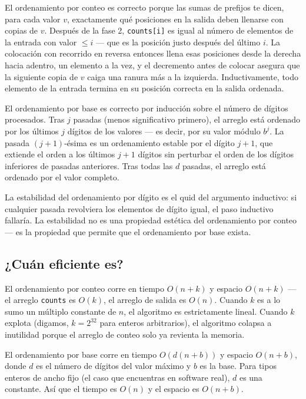 \documentclass[11pt,a4paper]{article}
\begin{document}
El ordenamiento por conteo es correcto porque las sumas de prefijos te dicen, para cada valor $v$, exactamente qué posiciones en la salida deben llenarse con copias de $v$. Después de la fase 2, \texttt{counts[i]} es igual al número de elementos de la entrada con valor $\le i$ --- que es la posición justo después del último $i$. La colocación con recorrido en reversa entonces llena esas posiciones desde la derecha hacia adentro, un elemento a la vez, y el decremento antes de colocar asegura que la siguiente copia de $v$ caiga una ranura más a la izquierda. Inductivamente, todo elemento de la entrada termina en su posición correcta en la salida ordenada.

El ordenamiento por base es correcto por inducción sobre el número de dígitos procesados. Tras $j$ pasadas (menos significativo primero), el arreglo está ordenado por los últimos $j$ dígitos de los valores --- es decir, por su valor módulo $b^j$. La pasada $(j+1)$-ésima es un ordenamiento estable por el dígito $j+1$, que extiende el orden a los últimos $j+1$ dígitos sin perturbar el orden de los dígitos inferiores de pasadas anteriores. Tras todas las $d$ pasadas, el arreglo está ordenado por el valor completo.

La estabilidad del ordenamiento por dígito es el quid del argumento inductivo: si cualquier pasada revolviera los elementos de dígito igual, el paso inductivo fallaría. La estabilidad no es una propiedad estética del ordenamiento por conteo --- es la propiedad que permite que el ordenamiento por base exista.

\subsection*{¿Cuán eficiente es?}

El ordenamiento por conteo corre en tiempo $O(n + k)$ y espacio $O(n + k)$ --- el arreglo \texttt{counts} es $O(k)$, el arreglo de salida es $O(n)$. Cuando $k$ es a lo sumo un múltiplo constante de $n$, el algoritmo es estrictamente lineal. Cuando $k$ explota (digamos, $k = 2^{32}$ para enteros arbitrarios), el algoritmo colapsa a inutilidad porque el arreglo de conteo solo ya revienta la memoria.

El ordenamiento por base corre en tiempo $O(d(n + b))$ y espacio $O(n + b)$, donde $d$ es el número de dígitos del valor máximo y $b$ es la base. Para tipos enteros de ancho fijo (el caso que encuentras en software real), $d$ es una constante. Así que el tiempo es $O(n)$ y el espacio es $O(n + b)$.
\end{document}
